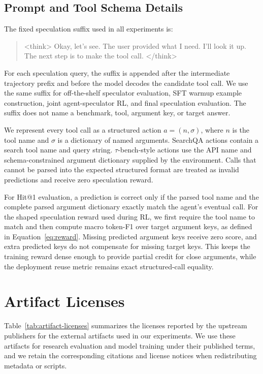 \subsection{Prompt and Tool Schema Details}
\label{sec:appendix:prompt-and-tool-schema-details}

The fixed speculation suffix used in all experiments is:
\begin{quote}
\small\ttfamily
\textless think\textgreater{} Okay, let's see. The user provided what I need.
I'll look it up. The next step is to make the tool call.
\textless/think\textgreater{}
\end{quote}

For each speculation query, the suffix is appended after the intermediate
trajectory prefix and before the model decodes the candidate tool call. We use
the same suffix for off-the-shelf speculator evaluation, SFT warmup example
construction, joint agent-speculator RL, and final speculation evaluation. The
suffix does not name a benchmark, tool, argument key, or target answer.

We represent every tool call as a structured action $a=(n,\sigma)$, where $n$
is the tool name and $\sigma$ is a dictionary of named arguments. SearchQA
actions contain a search tool name and query string. $\tau$-bench-style actions
use the API name and schema-constrained argument dictionary supplied by the
environment. Calls that cannot be parsed into the expected structured format are
treated as invalid predictions and receive zero speculation reward.

For Hit@1 evaluation, a prediction is correct only if the parsed tool name and
the complete parsed argument dictionary exactly match the agent's eventual call.
For the shaped speculation reward used during RL, we first require the tool name
to match and then compute macro token-F1 over target argument keys, as defined
in Equation~\ref{eq:reward}. Missing predicted argument keys receive zero score,
and extra predicted keys do not compensate for missing target keys. This keeps
the training reward dense enough to provide partial credit for close arguments,
while the deployment reuse metric remains exact structured-call equality.

\section{Artifact Licenses}
\label{sec:appendix:artifact-licenses}

Table~\ref{tab:artifact-licenses} summarizes the licenses reported by the
upstream publishers for the external artifacts used in our experiments. We use
these artifacts for research evaluation and model training under their published
terms, and we retain the corresponding citations and license notices when
redistributing metadata or scripts.

